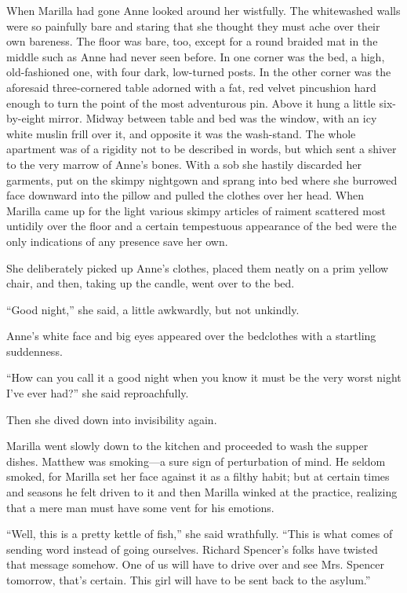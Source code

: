 \documentclass[a4paper]{article}
\begin{document}
\textsf{When Marilla had gone Anne looked around her wistfully. The whitewashed walls were so painfully bare and staring that she thought they must ache over their own bareness. The floor was bare, too, except for a round braided mat in the middle such as Anne had never seen before. \ttfamily In one corner was the bed, a high, old-fashioned one, with four dark, low-turned posts. In the other corner was the aforesaid three-cornered table adorned with a fat, red velvet pincushion hard enough to turn the point of the most adventurous pin. Above it hung a little six-by-eight mirror. Midway between table and bed was the window, with an icy white muslin frill over it, and opposite it was the wash-stand. \rmfamily The whole apartment was of a rigidity not to be described in words, but which sent a shiver to the very marrow of Anne's bones. With a sob she hastily discarded her garments, put on the skimpy nightgown and sprang into bed where she burrowed face downward into the pillow and pulled the clothes over her head. When Marilla came up for the light various skimpy articles of raiment scattered most untidily over the floor and a certain tempestuous appearance of the bed were the only indications of any presence save her own.}

She deliberately picked up Anne's clothes, placed them neatly on a prim yellow chair, and then, taking up the candle, went over to the bed.

``Good night,'' she said, a little awkwardly, but not unkindly.

\textrm{Anne's white face and big eyes \ttfamily appeared over the bedclothes with a startling suddenness.}

``How can you call it a good night when you know it must be the very worst night I've ever had?'' she said reproachfully.

Then she dived down into invisibility again.

\textrm{Marilla went slowly down to the kitchen and proceeded to wash the supper dishes. Matthew was smoking---a sure sign of perturbation of mind. \sffamily He seldom smoked, for Marilla set her face against it as a filthy habit; but at certain times and seasons he felt driven to it and then Marilla winked at the practice, realizing that a mere man must have some vent for his emotions.}

``Well, this is a pretty kettle of fish,'' she said wrathfully. ``This is what comes of sending word instead of going ourselves. Richard Spencer's folks have twisted that message somehow. One of us will have to drive over and see Mrs. Spencer tomorrow, that's certain. This girl will have to be sent back to the asylum.''
\end{document}
